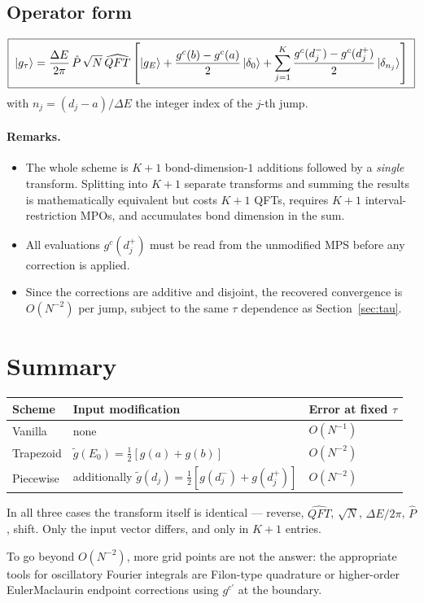 \documentclass{article}
\begin{document}
	\subsection{Operator form}
	
	\begin{align}
		\boxed{\;
			\ket{g_\tau} = \frac{\Delta E}{2\pi}\,\hat{P}\,\sqrt{N}\,\widehat{QFT}
			\left[\ket{g_E}
			+ \frac{g^c(b)-g^c(a)}{2}\ket{\delta_0}
			+ \sum_{j=1}^{K} \frac{g^c(d_j^-) - g^c(d_j^+)}{2}\ket{\delta_{n_j}}
			\right]\;}
	\end{align}
	with $n_j = (d_j - a)/\Delta E$ the integer index of the $j$-th jump.
	
	\paragraph{Remarks.}
	\begin{itemize}
		\item The whole scheme is $K+1$ bond-dimension-$1$ additions followed by a
		\emph{single} transform. Splitting into $K+1$ separate transforms and
		summing the results is mathematically equivalent but costs $K+1$ QFTs,
		requires $K+1$ interval-restriction MPOs, and accumulates bond
		dimension in the sum.
		\item All evaluations $g^c(d_j^+)$ must be read from the unmodified MPS
		before any correction is applied.
		\item Since the corrections are additive and disjoint, the recovered
		convergence is $O(N^{-2})$ per jump, subject to the same $\tau$
		dependence as Section~\ref{sec:tau}.
	\end{itemize}
	
	\section{Summary}
	
	\begin{center}
		\begin{tabular}{lll}
			\hline%
			Scheme & Input modification & Error at fixed $\tau$ \tabularnewline%
			\hline%
			Vanilla & none & $O(N^{-1})$ \tabularnewline%
			Trapezoid & $\tilde{g}(E_0) = \tfrac12[g(a)+g(b)]$ & $O(N^{-2})$ \tabularnewline%
			Piecewise & additionally $\tilde{g}(d_j) = \tfrac12[g(d_j^-)+g(d_j^+)]$ & $O(N^{-2})$ \tabularnewline%
			\hline%
		\end{tabular}
	\end{center}
	
	In all three cases the transform itself is identical --- reverse, $\widehat{QFT}$,
	$\sqrt{N}$, $\Delta E/2\pi$, $\hat{P}$, shift. Only the input vector differs, and
	only in $K+1$ entries.
	
	To go beyond $O(N^{-2})$, more grid points are not the answer: the appropriate
	tools for oscillatory Fourier integrals are Filon-type quadrature or
	higher-order Euler\textendash{}Maclaurin endpoint corrections using $g^{c\prime}$ at the
	boundary.
	
\end{document}
